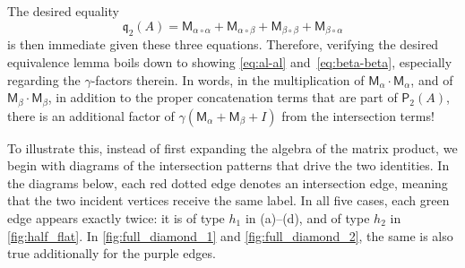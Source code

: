 \documentclass[12pt]{article}
\def \al {\alpha}
\newcommand{\gam}{\gamma}
\newcommand{\cm}{\mathsf{M} }
\newcommand{\fp}{\mathsf{P}}
\newcommand{\q}{\mathfrak q}
\begin{document}
 The desired equality \[
\q_2(A) =   \cm_{\al\circ \al} + \cm_{\al\circ\beta} +\cm_{\beta\circ\beta} + \cm_{\beta\circ\al}
 \]
 is then immediate given these three equations.
 Therefore, verifying the desired equivalence lemma boils down to showing \cref{eq:al-al} and~\cref{eq:beta-beta}, especially regarding the $\gam$-factors therein. In words, in the multiplication of $\cm_\al\cdot \cm_\al$, and of $\cm_\beta \cdot \cm_\beta$, in addition to the proper concatenation terms that are part of $\fp_2(A)$, there is an additional factor of \(
 \gam (\cm_\al +\cm_\beta+I)
 \) from the intersection terms!
 
To illustrate this, instead of first expanding the algebra of the matrix product, we begin with diagrams of the intersection patterns that drive the two identities. In the diagrams below, each red dotted edge denotes an intersection edge, meaning that the two incident vertices receive the same label. In all five cases, each green edge appears exactly twice: it is of type \(h_1\) in (a)--(d), and of type \(h_2\) in \cref{fig:half_flat}. In \cref{fig:full_diamond_1} and \cref{fig:full_diamond_2}, the same is also true additionally for the purple edges.
\end{document}
